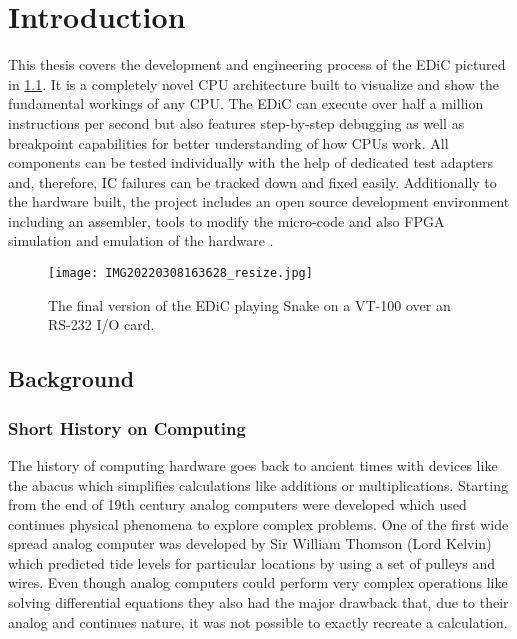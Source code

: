 \chapter{Introduction} \label{cha:intro}
This thesis covers the development and engineering process of the \gls{EDiC} pictured in \cref{fig:EDiCSnake}.
It is a completely novel \gls{CPU} architecture built to visualize and show the fundamental workings of any \gls{CPU}.
The \gls{EDiC} can execute over half a million instructions per second but also features step-by-step debugging as well as breakpoint capabilities for better understanding of how \glspl{CPU} work.
All components can be tested individually with the help of dedicated test adapters and, therefore, \gls{IC} failures can be tracked down and fixed easily.
Additionally to the hardware built, the project includes an open source development environment including an assembler, tools to modify the micro-code and also \gls{FPGA} simulation and emulation of the hardware \cite{EDiCGitHub}.
\begin{figure}[t]
  \centering
  \texttt{[image: IMG20220308163628\_resize.jpg]}
  \caption{The final version of the \gls{EDiC} playing Snake on a VT-100 over an RS-232 I/O card.}
  \label{fig:EDiCSnake}
\end{figure}
\section{Background}
\subsection{Short History on Computing}
The history of computing hardware goes back to ancient times with devices like the abacus which simplifies calculations like additions or multiplications.
Starting from the end of 19th century analog computers were developed which used continues physical phenomena to explore complex problems.
One of the first wide spread analog computer was developed by Sir William Thomson (Lord Kelvin) which predicted tide levels for particular locations by using a set of pulleys and wires.\cite{sep-computing-history}
Even though analog computers could perform very complex operations like solving differential equations \cite{analogDiff} they also had the major drawback that, due to their analog and continues nature, it was not possible to exactly recreate a calculation.

